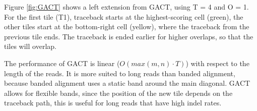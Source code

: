 \documentclass[../main/thesis.tex]{subfiles}
\begin{document}


Figure \ref{fig:GACT} shows a left extension from GACT, using T = 4 and O = 1.
For the first tile (T1), traceback starts at the highest-scoring cell (green), the other tiles start at the bottom-right cell (yellow), where the traceback from the previous tile ends.
The traceback is ended earlier for higher overlaps, so that the tiles will overlap.




The performance of GACT is linear ($O(max(m,n)\cdot T)$) with respect to the length of the reads.
It is more suited to long reads than banded alignment, because banded alignment uses a static band around the main diagonal.
GACT allows for flexible bands, since the position of the new tile depends on the traceback path, this is useful for long reads that have high indel rates.
\end{document}
